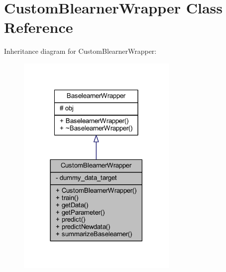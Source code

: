 \hypertarget{class_custom_blearner_wrapper}{}\section{Custom\+Blearner\+Wrapper Class Reference}
\label{class_custom_blearner_wrapper}


Inheritance diagram for Custom\+Blearner\+Wrapper\+:\nopagebreak
\begin{figure}[H]
\begin{center}
\leavevmode
\includegraphics[width=218pt]{class_custom_blearner_wrapper__inherit__graph}
\end{center}
\end{figure}



